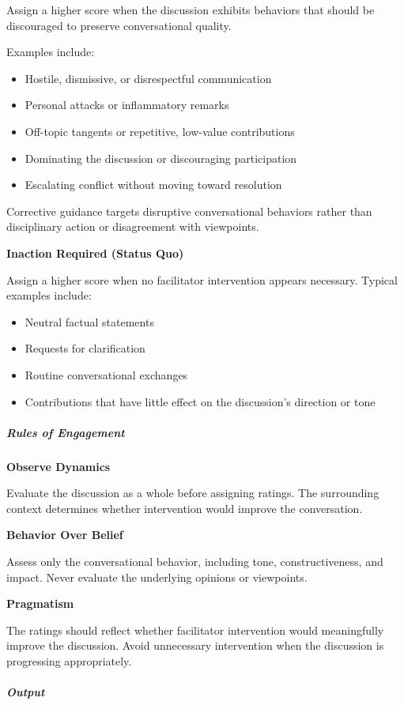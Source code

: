 \documentclass[11pt]{article}
\theoremstyle{definition}
\theoremstyle{plain}
\begin{document}
Assign a higher score when the discussion exhibits behaviors that should be discouraged to preserve conversational quality.

Examples include:
\begin{itemize}
	\item Hostile, dismissive, or disrespectful communication
	\item Personal attacks or inflammatory remarks
	\item Off-topic tangents or repetitive, low-value contributions
	\item Dominating the discussion or discouraging participation
	\item Escalating conflict without moving toward resolution
\end{itemize}

Corrective guidance targets disruptive conversational behaviors rather than disciplinary action or disagreement with viewpoints.

\textbf{Inaction Required (Status Quo)}

Assign a higher score when no facilitator intervention appears necessary. Typical examples include:
\begin{itemize}
	\item Neutral factual statements
	\item Requests for clarification
	\item Routine conversational exchanges
	\item Contributions that have little effect on the discussion's direction or tone
\end{itemize}

\subparagraph{Rules of Engagement}

\textbf{Observe Dynamics}

Evaluate the discussion as a whole before assigning ratings. The surrounding context determines whether intervention would improve the conversation.

\textbf{Behavior Over Belief}

Assess only the conversational behavior, including tone, constructiveness, and impact. Never evaluate the underlying opinions or viewpoints.

\textbf{Pragmatism}

The ratings should reflect whether facilitator intervention would meaningfully improve the discussion. Avoid unnecessary intervention when the discussion is progressing appropriately.

\subparagraph{Output}
\end{document}
